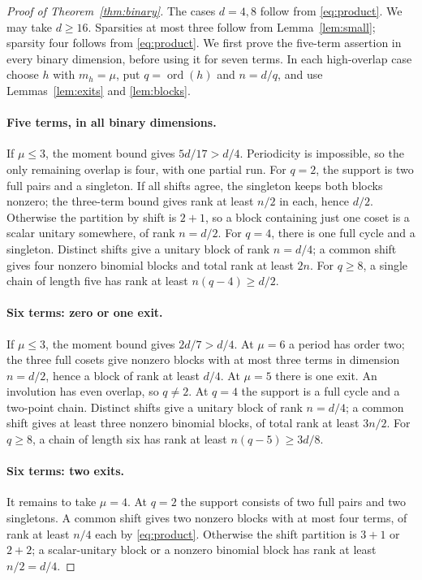 \documentclass[11pt,a4paper]{article}
\theoremstyle{remark}\newtheorem{remark}[theorem]{Remark}
\DeclareMathOperator{\ord}{ord}
\begin{document}
\begin{proof}[Proof of Theorem~\ref{thm:binary}]
The cases $d=4,8$ follow from \eqref{eq:product}. We may take $d\ge16$. Sparsities at most three follow from Lemma~\ref{lem:small}; sparsity four follows from \eqref{eq:product}. We first prove the five-term assertion in every binary dimension, before using it for seven terms. In each high-overlap case choose $h$ with $m_h=\mu$, put $q=\ord(h)$ and $n=d/q$, and use Lemmas~\ref{lem:exits} and \ref{lem:blocks}.

\paragraph{Five terms, in all binary dimensions.}
If $\mu\le3$, the moment bound gives $5d/17>d/4$. Periodicity is impossible, so the only remaining overlap is four, with one partial run.
For $q=2$, the support is two full pairs and a singleton. If all shifts agree, the singleton keeps both blocks nonzero; the three-term bound gives rank at least $n/2$ in each, hence $d/2$. Otherwise the partition by shift is $2+1$, so a block containing just one coset is a scalar unitary somewhere, of rank $n=d/2$.
For $q=4$, there is one full cycle and a singleton. Distinct shifts give a unitary block of rank $n=d/4$; a common shift gives four nonzero binomial blocks and total rank at least $2n$.
For $q\ge8$, a single chain of length five has rank at least $n(q-4)\ge d/2$.

\paragraph{Six terms: zero or one exit.}
If $\mu\le3$, the moment bound gives $2d/7>d/4$. At $\mu=6$ a period has order two; the three full cosets give nonzero blocks with at most three terms in dimension $n=d/2$, hence a block of rank at least $d/4$.
At $\mu=5$ there is one exit. An involution has even overlap, so $q\ne2$. At $q=4$ the support is a full cycle and a two-point chain. Distinct shifts give a unitary block of rank $n=d/4$; a common shift gives at least three nonzero binomial blocks, of total rank at least $3n/2$. For $q\ge8$, a chain of length six has rank at least $n(q-5)\ge3d/8$.

\paragraph{Six terms: two exits.}
It remains to take $\mu=4$. At $q=2$ the support consists of two full pairs and two singletons. A common shift gives two nonzero blocks with at most four terms, of rank at least $n/4$ each by \eqref{eq:product}. Otherwise the shift partition is $3+1$ or $2+2$; a scalar-unitary block or a nonzero binomial block has rank at least $n/2=d/4$.


\end{proof}
\end{document}
